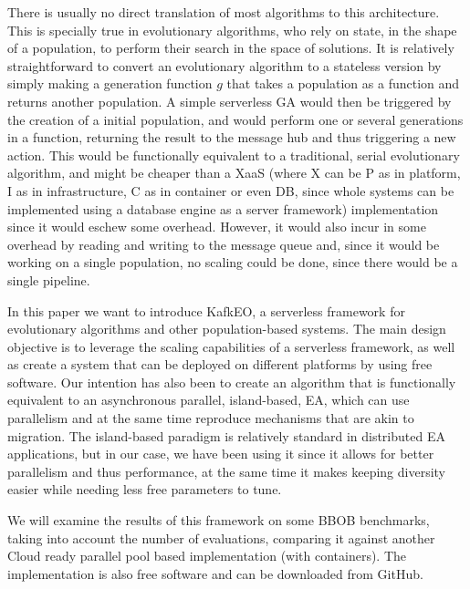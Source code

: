 \documentclass[sigconf]{acmart}
\begin{document}
There is usually no direct translation of most algorithms to this
architecture. This is specially true in evolutionary algorithms, who
rely on state, in the shape of a population, to perform their search
in the space of solutions. It is relatively straightforward to convert
an evolutionary algorithm to a stateless version by simply making a
{\sf generation} function $g$ that takes a population as a function
and returns another population. A simple serverless GA would then be
triggered by the creation of a initial population, and would perform
one or several generations in a function, returning the result to the
message hub and thus triggering a new action. This would be
functionally equivalent to a traditional, serial evolutionary
algorithm, and might be cheaper than a XaaS (where X can be P as in
platform, I as in infrastructure, C as in container or even DB, since
whole systems can be implemented using a database engine as a server framework) 
implementation since it
would eschew some overhead. However, it would also incur in some
overhead by reading and writing to the message queue and, since it
would be working on a single population, no scaling could be done,
since there would be a single pipeline.

In this paper we want to introduce KafkEO, a serverless framework for
evolutionary algorithms and other population-based systems. The main
design objective is to leverage the scaling capabilities of a
serverless framework, as well as create a system that can be deployed
on different platforms by using free software. Our intention has
also been to create an algorithm that is functionally equivalent to an asynchronous
parallel, island-based, EA, which can use parallelism and at the same
time reproduce mechanisms that are akin to migration. The island-based 
paradigm is relatively standard in distributed EA applications, but in our case, 
we have been using it since it allows for better parallelism
and thus performance, at the same time it makes keeping diversity
easier while needing less free parameters to tune.

We will examine the results of this framework on some BBOB benchmarks,
taking into account
the number of evaluations, comparing it
against another Cloud ready parallel pool based implementation (with
containers).
The
implementation is also free software and can be downloaded from
GitHub.
\end{document}
